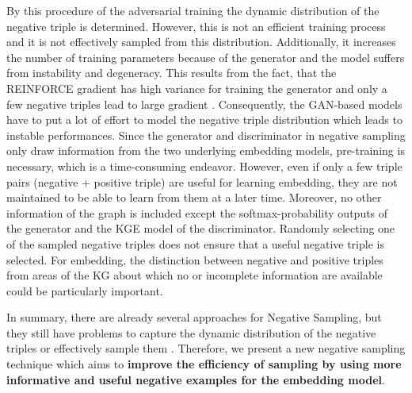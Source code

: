 By this procedure of the adversarial training the dynamic distribution of the negative triple is determined. 
However, this is not an efficient training process and it is not effectively sampled from this distribution.
Additionally, it increases the number of training parameters because of the generator and the model suffers from instability and degeneracy.
This results from the fact, that the \textsc{REINFORCE} gradient has high variance for training the generator and only a few negative triples lead to large gradient \cite{zhang2021efficient}.
Consequently, the \ac{GAN}-based models have to put a lot of effort to model the negative triple distribution which leads to instable performances.
Since the generator and discriminator in negative sampling only draw information from the two underlying embedding models, pre-training is necessary, which is a time-consuming endeavor.
However, even if only a few triple pairs (negative + positive triple) are useful for learning embedding, they are not maintained to be able to learn from them at a later time.
Moreover, no other information of the graph is included except the softmax-probability outputs of the generator and the \ac{KGE} model of the discriminator.
Randomly selecting one of the sampled negative triples does not ensure that a useful negative triple is selected.
For embedding, the distinction between negative and positive triples from areas of the KG about which no or incomplete information are available could be particularly important.

In summary, there are already several approaches for Negative Sampling, but they still have problems to capture the dynamic distribution of the negative triples or effectively sample them \cite{zhang2021efficient}.
Therefore, we present a new negative sampling technique which aims to \textbf{improve the efficiency of sampling by using more informative and useful negative examples for the embedding model}.


